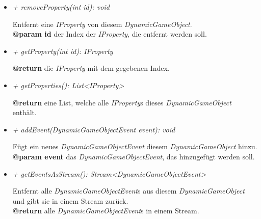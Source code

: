\begin{itemize}
                \item \textit{+ removeProperty(int id): void}
                    \begin{leftbar}[0.9\linewidth]
                        Entfernt eine \textit{IProperty} von diesem \textit{DynamicGameObject}.\\
                        \textbf{@param id} der Index der \textit{IProperty}, die entfernt werden soll.
                    \end{leftbar}
                \item \textit{+ getProperty(int id): IProperty}
                    \begin{leftbar}[0.9\linewidth]
                        \textbf{@return} die \textit{IProperty} mit dem gegebenen Index.
                    \end{leftbar}
                \item \textit{+ getProperties(): List<IProperty>}
                    \begin{leftbar}[0.9\linewidth]
                        \textbf{@return} eine List, welche alle \textit{IProperty}s dieses \textit{DynamicGameObject} enthält.
                    \end{leftbar}
                \item \textit{+ addEvent(DynamicGameObjectEvent event): void}
                    \begin{leftbar}[0.9\linewidth]
                        Fügt ein neues \textit{DynamicGameObjectEvent} diesem \textit{DynamicGameObject} hinzu.\\
                        \textbf{@param event} das \textit{DynamicGameObjectEvent}, das hinzugefügt werden soll.
                    \end{leftbar}
                \item \textit{+ getEventsAsStream(): Stream<DynamicGameObjectEvent>}
                    \begin{leftbar}[0.9\linewidth]
                        Entfernt alle \textit{DynamicGameObjectEvent}s aus diesem \textit{DynamicGameObject} und gibt sie in einem Stream zurück.\\
                        \textbf{@return} alle \textit{DynamicGameObjectEvent}s in einem Stream.
                    \end{leftbar}
                

\end{itemize}
